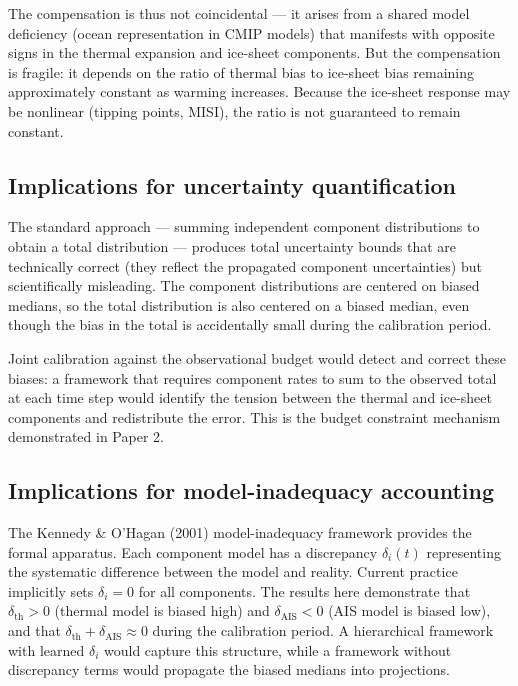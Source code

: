 \documentclass[11pt]{article}
\begin{document}
The compensation is thus not coincidental --- it arises from a shared model deficiency (ocean representation in CMIP models) that manifests with opposite signs in the thermal expansion and ice-sheet components.  But the compensation is fragile: it depends on the ratio of thermal bias to ice-sheet bias remaining approximately constant as warming increases.  Because the ice-sheet response may be nonlinear (tipping points, MISI), the ratio is not guaranteed to remain constant.

\subsection{Implications for uncertainty quantification}

The standard approach --- summing independent component distributions to obtain a total distribution --- produces total uncertainty bounds that are technically correct (they reflect the propagated component uncertainties) but scientifically misleading.  The component distributions are centered on biased medians, so the total distribution is also centered on a biased median, even though the bias in the total is accidentally small during the calibration period.

Joint calibration against the observational budget would detect and correct these biases: a framework that requires component rates to sum to the observed total at each time step would identify the tension between the thermal and ice-sheet components and redistribute the error.  This is the budget constraint mechanism demonstrated in Paper 2.

\subsection{Implications for model-inadequacy accounting}

The Kennedy \& O'Hagan (2001) model-inadequacy framework provides the formal apparatus.  Each component model has a discrepancy $\delta_i(t)$ representing the systematic difference between the model and reality.  Current practice implicitly sets $\delta_i = 0$ for all components.  The results here demonstrate that $\delta_{\text{th}} > 0$ (thermal model is biased high) and $\delta_{\text{AIS}} < 0$ (AIS model is biased low), and that $\delta_{\text{th}} + \delta_{\text{AIS}} \approx 0$ during the calibration period.  A hierarchical framework with learned $\delta_i$ would capture this structure, while a framework without discrepancy terms would propagate the biased medians into projections.
\end{document}

